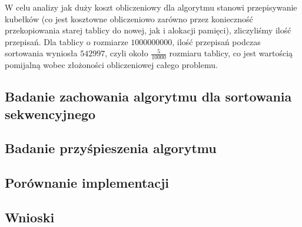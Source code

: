 \documentclass{article}
\begin{document}
    W celu analizy jak duży koszt obliczeniowy dla algorytmu stanowi przepisywanie kubełków (co jest kosztowne obliczeniowo zarówno przez konieczność przekopiowania starej tablicy do nowej, jak i alokacji pamięci), zliczyliśmy ilość przepisań. Dla tablicy o rozmiarze $1000 000 000$, ilość przepisań podczas sortowania wyniosła $542 997$, czyli około $\frac{5}{10000}$ rozmiaru tablicy, co jest wartością pomijalną wobec złożoności obliczeniowej całego problemu.
    
    \subsection{Badanie zachowania algorytmu dla sortowania sekwencyjnego}
    
    \subsection{Badanie przyśpieszenia algorytmu}
    
    \subsection{Porównanie implementacji}
    
    \subsection{Wnioski}
    
    
\end{document}
